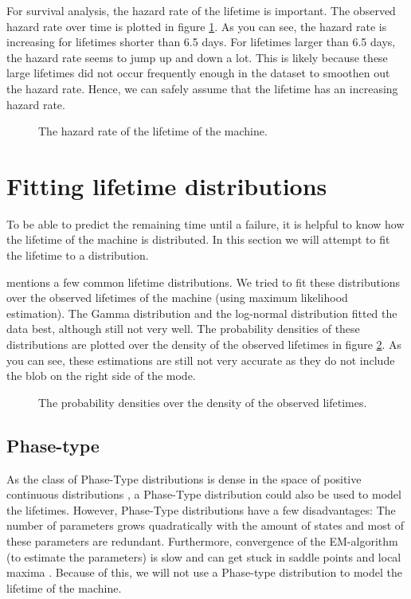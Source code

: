 For survival analysis, the hazard rate of the lifetime is important.
The observed hazard rate over time is plotted in figure \ref{figure:hazard}.
As you can see, the hazard rate is increasing for lifetimes shorter than 6.5 days.
For lifetimes larger than 6.5 days, the hazard rate seems to jump up and down a lot.
This is likely because these large lifetimes did not occur frequently enough in the dataset to smoothen out the hazard rate.
Hence, we can safely assume that the lifetime has an increasing hazard rate.
\begin{figure}[H]\label{figure:hazard}
	\centering
	\setlength{}

\caption{The hazard rate of the lifetime of the machine.}
\end{figure}

\section{Fitting lifetime distributions}
To be able to predict the remaining time until a failure, it is helpful to know how the lifetime of the machine is distributed.
In this section we will attempt to fit the lifetime to a distribution.

\cite{Lai2006} mentions a few common lifetime distributions.
We tried to fit these distributions over the observed lifetimes of the machine (using maximum likelihood estimation).
The Gamma distribution and the log-normal distribution fitted the data best, although still not very well.
The probability densities of these distributions are plotted over the density of the observed lifetimes in figure \ref{figure:fits}.
As you can see, these estimations are still not very accurate as they do not include the blob on the right side of the mode.

\begin{figure}[H]\label{figure:fits}
	\centering
	\setlength{}
	
	\caption{The probability densities over the density of the observed lifetimes.}
\end{figure}
\subsection{Phase-type}
As the class of Phase-Type distributions is dense in the space of positive continuous distributions \cite{Ocinneide1999}, a Phase-Type distribution could also be used to model the lifetimes.
However, Phase-Type distributions have a few disadvantages:
The number of parameters grows quadratically with the amount of states and most of these parameters are redundant.
Furthermore, convergence of the EM-algorithm (to estimate the parameters) is slow and can get stuck in saddle points and local maxima \cite{Asmussen1996}.
Because of this, we will not use a Phase-type distribution to model the lifetime of the machine.

